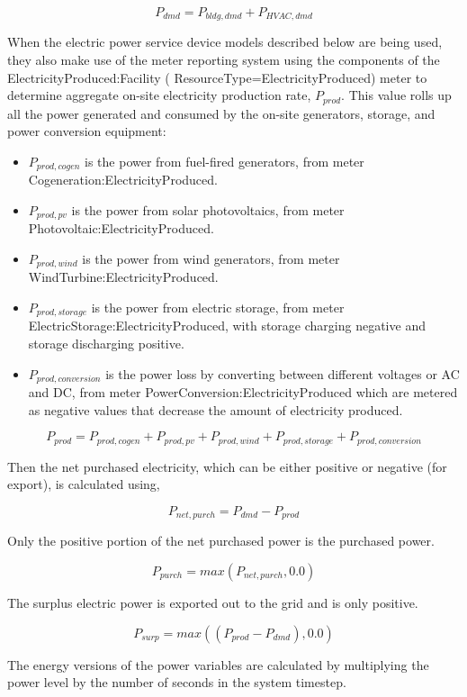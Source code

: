 \begin{equation}
  P_{dmd} = P_{bldg,dmd} + P_{HVAC,dmd}
\end{equation}

When the electric power service device models described below are being used, they also make use of the meter reporting system using the components of the ElectricityProduced:Facility ( ResourceType=ElectricityProduced) meter to determine aggregate on-site electricity production rate, $P_{prod}$.  This value rolls up all the power generated and consumed by the on-site generators, storage, and power conversion equipment:

\begin{itemize}
  \item $P_{prod,cogen}$ is the power from fuel-fired generators, from meter Cogeneration:ElectricityProduced.
  \item $P_{prod,pv}$ is the power from solar photovoltaics, from meter Photovoltaic:ElectricityProduced.
  \item $P_{prod,wind}$ is the power from wind generators, from meter WindTurbine:ElectricityProduced.
  \item $P_{prod,storage}$ is the power from electric storage, from meter ElectricStorage:ElectricityProduced, with storage charging negative and storage discharging positive.
  \item $P_{prod,conversion}$ is the power loss by converting between different voltages or AC and DC, from meter PowerConversion:ElectricityProduced which are metered as negative values that decrease the amount of electricity produced.
\end{itemize}

\begin{equation}
  {P_{prod}}= {P_{prod,cogen}} + {P_{prod,pv}} + {P_{prod,wind}} + {P_{prod,storage}} + {P_{prod,conversion}}
\end{equation}

Then the net purchased electricity, which can be either positive or negative (for export), is calculated using,

\begin{equation}
  {P_{net,purch}} = {P_{dmd}} - {P_{prod}}
\end{equation}

Only the positive portion of the net purchased power is the purchased power.

\begin{equation}
  {P_{purch}} = { max ( {P_{net,purch}}, 0.0 ) }
\end{equation}

The surplus electric power is exported out to the grid and is only positive.

\begin{equation}
  {P_{surp}} =  { max ( ({P_{prod}} - {P_{dmd}}) , 0.0 ) }
\end{equation}

The energy versions of the power variables are calculated by multiplying the power level by the number of seconds in the system timestep.
